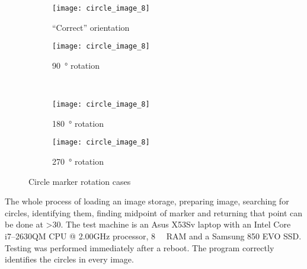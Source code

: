 \begin{figure}[ht]
\centering
\begin{subfigure}[b]{0.45\linewidth}
\centering
    \texttt{[image: circle\_image\_8]}
    \caption{``Correct'' orientation}
\label{fig:marker_rotation_1}
\end{subfigure}
\begin{subfigure}[b]{0.45\linewidth}
\centering
    \texttt{[image: circle\_image\_8]}
    \caption{\SI{90}{\degree} rotation}
\label{fig:marker_rotation_2}
\end{subfigure}\\
\begin{subfigure}[b]{0.45\linewidth}
\centering
    \texttt{[image: circle\_image\_8]}
    \caption{\SI{180}{\degree} rotation}
\label{fig:marker_rotation_3}
\end{subfigure}
\begin{subfigure}[b]{0.45\linewidth}
\centering
    \texttt{[image: circle\_image\_8]}
    \caption{\SI{270}{\degree} rotation}
\label{fig:marker_rotation_4}
\end{subfigure}
\caption{Circle marker rotation cases}
\label{fig:marker_rotation}
\end{figure}

The whole process of loading an image storage, preparing image, searching for circles, identifying them,
finding midpoint of marker and returning that point can be done at \SI{>30}{\fps}.
The test machine is an Asus X53Sv laptop with an Intel Core i7--2630QM CPU @ 2.00GHz processor, \SI{8}{\giga\byte} RAM and a Samsung 850 EVO SSD.\@
Testing was performed immediately after a reboot.
The program correctly identifies the circles in every image.
